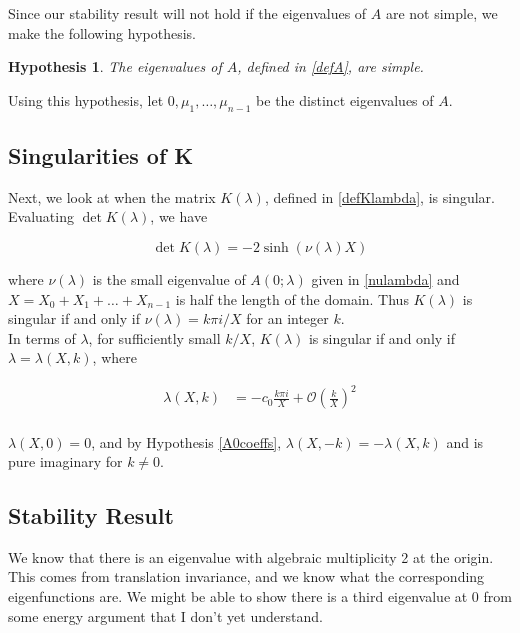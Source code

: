 \documentclass[12pt]{article}
\newtheorem{hypothesis}{Hypothesis}
\begin{document}
Since our stability result will not hold if the eigenvalues of $A$ are not simple, we make the following hypothesis.

\begin{hypothesis}\label{Asimpleeigs}
The eigenvalues of $A$, defined in \eqref{defA}, are simple.
\end{hypothesis}

Using this hypothesis, let $0, \mu_1, \dots, \mu_{n-1}$ be the distinct eigenvalues of $A$.

\subsection{Singularities of K}

Next, we look at when the matrix $K(\lambda)$, defined in \eqref{defKlambda}, is singular. Evaluating $\det K(\lambda)$, we have

\begin{equation}
\det K(\lambda) = -2 \sinh( \nu(\lambda) X )
\end{equation}

where $\nu(\lambda)$ is the small eigenvalue of $A(0; \lambda)$ given in \eqref{nulambda} and $X = X_0 + X_1 + \dots + X_{n-1}$ is half the length of the domain. Thus $K(\lambda)$ is singular if and only if $\nu(\lambda) = k \pi i/X$ for an integer $k$. \\

In terms of $\lambda$, for sufficiently small $k/X$, $K(\lambda)$ is singular if and only if $\lambda = \lambda(X, k)$, where

\begin{align}\label{lambdaXk}
\lambda(X,k)
&= -c_0 \frac{k \pi i }{X} + \mathcal{O}\left(\frac{k}{X}\right)^2 \\
\end{align} 

$\lambda(X,0) = 0$, and by Hypothesis \ref{A0coeffs}, $\lambda(X, -k) = -\lambda(X, k)$ and is pure imaginary for $k \neq 0$.

\subsection{Stability Result}

We know that there is an eigenvalue with algebraic multiplicity 2 at the origin. This comes from translation invariance, and we know what the corresponding eigenfunctions are. We might be able to show there is a third eigenvalue at 0 from some energy argument that I don't yet understand.\\
\end{document}
